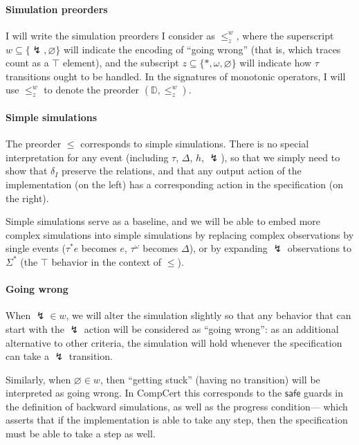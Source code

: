 \documentclass[11pt]{article}
\begin{document}

\paragraph{Simulation preorders} %

I will write the simulation preorders I consider as $\le^w_z$,
where the superscript $w \subseteq \{\lightning, \varnothing\}$ will indicate
the encoding of ``going wrong''
(that is, which traces count as a $\top$ element),
and the subscript $z \subseteq \{*, \omega, \varnothing\}$ will indicate
how $\tau$ transitions ought to be handled.
In the signatures of monotonic operators,
I will use $\le^w_z$ to denote the preorder $(\mathbb{D}, \le^w_z)$.


\paragraph{Simple simulations} %

The preorder $\le$
corresponds to simple simulations.
There is no special interpretation for any event
(including $\tau$, $\Delta$, $h$, $\lightning$),
so that we simply need to show that
$\delta_I$ preserve the relations, and that
any output action of the implementation
(on the left)
has a corresponding action in the specification
(on the right).

Simple simulations serve as a baseline,
and we will be able to embed more complex simulations
into simple simulations
by replacing complex observations by single events
($\tau^*e$ becomes $e$, $\tau^\omega$ becomes $\Delta$),
or by expanding $\lightning$ observations to $\Sigma^*$
(the $\top$ behavior in the context of $\le$).


\paragraph{Going wrong} %

When $\lightning \in w$,
we will alter the simulation slightly
so that any behavior that can start with the $\lightning$ action
will be considered as ``going wrong'':
as an additional alternative to other criteria,
the simulation will hold whenever
the specification can take a $\lightning$ transition.

Similarly, when $\varnothing \in w$,
then ``getting stuck'' (having no transition)
will be interpreted as going wrong.
In CompCert this corresponds to the $\mathsf{safe}$
guards in the definition of backward simulations,
as well as the progress condition---%
which asserts that if the implementation is able to take any step,
then the specification must be able to take a step as well.
\end{document}
